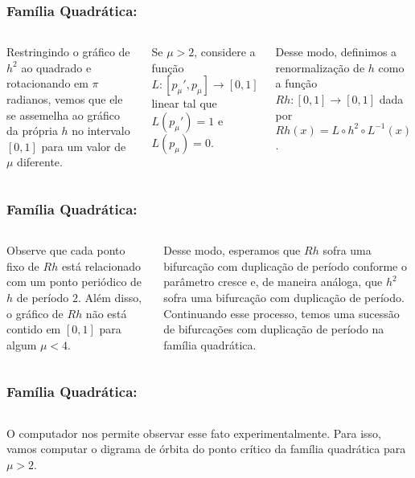 \begin{frame}
\vspace{5pt}
\frametitle{Família Quadrática: \subsecname}
\begin{columns}
\column{\dimexpr\paperwidth-15pt}

Restringindo o gráfico de $h^2$ ao quadrado e rotacionando em $\pi$ radianos, vemos que ele se assemelha ao gráfico da própria $h$ no intervalo $[0, 1]$ para um valor de $\mu$ diferente.

Se $\mu > 2$, considere a função $L: [p_\mu', p_\mu] \to [0, 1]$ linear tal que $L(p_\mu') = 1$ e $L(p_\mu) = 0$.

Desse modo, definimos a renormalização de $h$ como a função $Rh: [0, 1] \to [0, 1]$ dada por $Rh(x) = L \circ h^2 \circ L^{-1}(x)$.

\end{columns}
\end{frame}


\begin{frame}
\vspace{5pt}
\frametitle{Família Quadrática: \subsecname}
\begin{columns}
\column{\dimexpr\paperwidth-15pt}

Observe que cada ponto fixo de $Rh$ está relacionado com um ponto periódico de $h$ de período $2$. Além disso, o gráfico de $Rh$ não está contido em $[0, 1]$ para algum $\mu < 4$.

Desse modo, esperamos que $Rh$ sofra uma bifurcação com duplicação de período conforme o parâmetro cresce e, de maneira análoga, que $h^2$ sofra uma bifurcação com duplicação de período. Continuando esse processo, temos uma sucessão de bifurcações com duplicação de período na família quadrática.

\end{columns}
\end{frame}


\begin{frame}
\vspace{5pt}
\frametitle{Família Quadrática: \subsecname}
\begin{columns}
\column{\dimexpr\paperwidth-15pt}

O computador nos permite observar esse fato experimentalmente.
Para isso, vamos computar o digrama de órbita do ponto crítico da família quadrática para $\mu > 2$.

\end{columns}
\end{frame}
